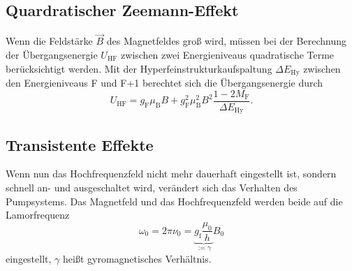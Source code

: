 \subsection{Quardratischer Zeemann-Effekt}
Wenn die Feldstärke $\vec B$ des Magnetfeldes groß wird, müssen bei der Berechnung der Übergangsenergie $U_\text{HF}$ zwischen zwei Energieniveaus quadratische Terme berücksichtigt werden. Mit der Hyperfeinstrukturkaufspaltung $\Delta E_\text{Hy}$  zwischen den Energieniveaus F und F+1 berechtet sich die Übergangsenergie durch
\begin{equation}
  U_\text{HF}=g_\text{F}\mu_\text{B}B+g_\text{F}^2\mu^2_\text{B}B^2\frac{1-2M_\text{F}}{\Delta E_\text{Hy}}.
\end{equation}

\subsection{Transistente Effekte}
Wenn nun das Hochfrequenzfeld nicht mehr dauerhaft eingestellt ist, sondern schnell an- und ausgeschaltet wird, verändert sich das Verhalten des Pumpsystems. Das Magnetfeld und das Hochfrequenzfeld werden beide auf die Lamorfrequenz
\begin{equation}
  \omega_0=2\pi\nu_0=\underbrace{g_\text{f}\frac{\mu_0}{h}}_{:=\gamma}B_0
\end{equation}
eingestellt, $\gamma$ heißt gyromagnetisches Verhältnis.

